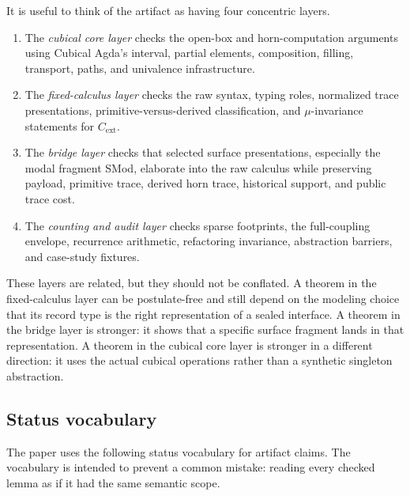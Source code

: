 It is useful to think of the artifact as having four concentric layers.
\begin{enumerate}
\item The \emph{cubical core layer} checks the open-box and horn-computation arguments using
Cubical Agda's interval, partial elements, composition, filling, transport, paths, and
univalence infrastructure.
\item The \emph{fixed-calculus layer} checks the raw syntax, typing roles, normalized trace
presentations, primitive-versus-derived classification, and \(\mu\)-invariance statements for
\(C_{\mathrm{ext}}\).
\item The \emph{bridge layer} checks that selected surface presentations, especially the modal
fragment SMod, elaborate into the raw calculus while preserving payload, primitive trace,
derived horn trace, historical support, and public trace cost.
\item The \emph{counting and audit layer} checks sparse footprints, the full-coupling envelope,
recurrence arithmetic, refactoring invariance, abstraction barriers, and case-study fixtures.
\end{enumerate}
These layers are related, but they should not be conflated.  A theorem in the fixed-calculus
layer can be postulate-free and still depend on the modeling choice that its record type is the
right representation of a sealed interface.  A theorem in the bridge layer is stronger: it shows
that a specific surface fragment lands in that representation.  A theorem in the cubical core
layer is stronger in a different direction: it uses the actual cubical operations rather than a
synthetic singleton abstraction.

\subsection{Status vocabulary}
\label{subsec:status-vocabulary}

The paper uses the following status vocabulary for artifact claims.  The vocabulary is
intended to prevent a common mistake: reading every checked lemma as if it had the same
semantic scope.

